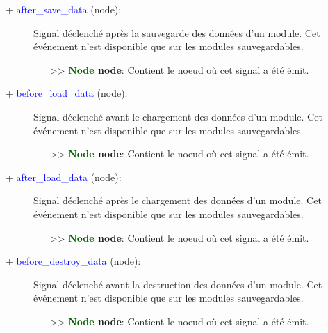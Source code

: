 \documentclass[a4paper, 11pt]{article}
\begin{document}
	\begin{description}
		\item [+ \textcolor{blue}{after\_save\_data} (node):] Signal déclenché après la sauvegarde des 
		données d'un module. Cet événement n'est disponible que sur les modules sauvegardables.
		\begin{itemize}
			\item [>> \textbf{\textcolor{darkgreen}{Node} node}:] Contient le noeud où cet signal a été 
			émit.\\
		\end{itemize}
	\end{description}
	\begin{description}
		\item [+ \textcolor{blue}{before\_load\_data} (node):] Signal déclenché avant le chargement des 
		données d'un module. Cet événement n'est disponible que sur les modules sauvegardables.
		\begin{itemize}
			\item [>> \textbf{\textcolor{darkgreen}{Node} node}:] Contient le noeud où cet signal a été 
			émit.\\
		\end{itemize}
	\end{description}
	\begin{description}
		\item [+ \textcolor{blue}{after\_load\_data} (node):] Signal déclenché après le chargement des 
		données d'un module. Cet événement n'est disponible que sur les modules sauvegardables.
		\begin{itemize}
			\item [>> \textbf{\textcolor{darkgreen}{Node} node}:] Contient le noeud où cet signal a été 
			émit.\\
		\end{itemize}
	\end{description}
	\begin{description}
		\item [+ \textcolor{blue}{before\_destroy\_data} (node):] Signal déclenché avant la destruction des 
		données d'un module. Cet événement n'est disponible que sur les modules sauvegardables.
		\begin{itemize}
			\item [>> \textbf{\textcolor{darkgreen}{Node} node}:] Contient le noeud où cet signal a été 
			émit.\\
		\end{itemize}
	\end{description}
\end{document}

